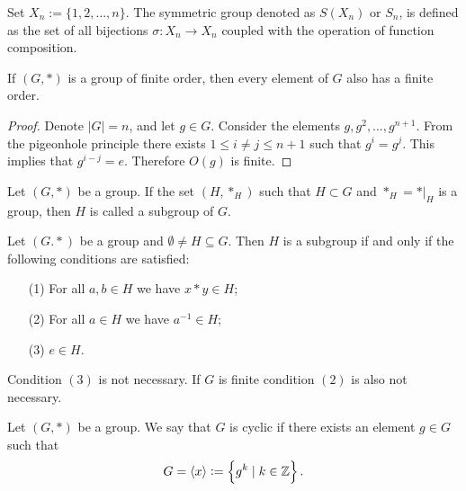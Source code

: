 \documentclass[11pt,a4paper]{article}
\begin{document}
  \begin{definition}
    Set $X_n := \{1,2,\dots,n\}$. 
	  The symmetric group denoted as $S(X_n)$ or $S_n$, is defined as the set 
    of all bijections $\sigma \colon X_n \to X_n$ coupled with the operation 
    of function composition.
  \end{definition}

  \begin{proposition}
    If $(G, *)$ is a group of finite order, then every element of $G$ also has
    a finite order.
  \end{proposition}
  \begin{proof}
    Denote $|G|=n$, and let $g \in G$.
    Consider the elements $g, g^2, \dots, g^{n+1}$.
    From the pigeonhole principle there exists $1 \le i \neq j \le n+1$
    such that $g^i = g^j$. This implies that $g^{i-j} = e$.
  	Therefore $O(g)$ is finite.
  \end{proof}

  \begin{definition}[Subgroup]
    Let $(G, *)$ be a group. If the set $(H,*_H)$ such that $H \subset G$
    and $*_H = *\vert_H$ is a group, then $H$ is called a subgroup of $G$.
  \end{definition}

  \begin{proposition}
    Let $(G.*)$ be a group and $\emptyset \neq H \subseteq G$.
    Then $H$ is a subgroup if and only if the following conditions are
    satisfied:
    \begin{enumerate}
      \item[(1)] For all $a,b \in H$ we have $x * y \in H$;
      \item[(2)] For all $a \in H$ we have $a^{-1} \in H$;
      \item[(3)] $e \in H$.
    \end{enumerate}
  \end{proposition}
  \begin{remark}
    Condition $(3)$ is not necessary.
    If $G$ is finite condition $(2)$ is also not necessary.
  \end{remark}

  \begin{definition}
    Let $(G,*)$ be a group. We say that $G$ is cyclic if there exists
    an element $g \in G$ such that
    \[
      G = \langle x \rangle := \set{g^k \mid k \in \mathbb{Z}}.
    \]
  \end{definition}
\end{document}
